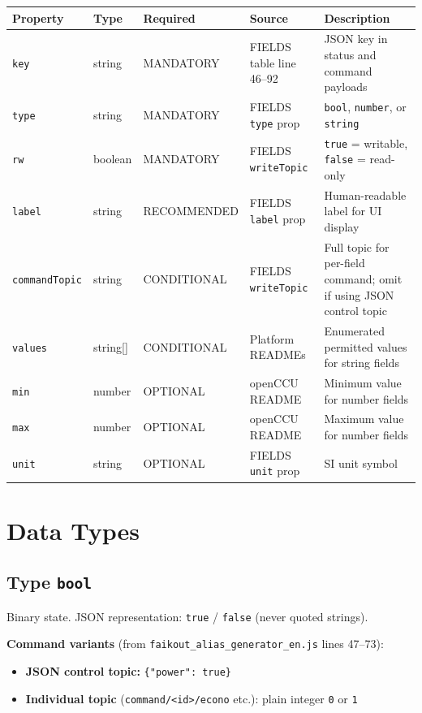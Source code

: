\documentclass[11pt,a4paper]{article}
\newcommand{\topic}[1]{\texttt{\color{accent}#1}}
\begin{document}
\begin{tabularx}{\textwidth}{@{}llllX@{}}
\toprule
\textbf{Property} & \textbf{Type} & \textbf{Required} & \textbf{Source} & \textbf{Description} \\
\midrule
\rowcolor{lightbg}
\texttt{key}          & string  & MANDATORY   & FIELDS table line 46–92 & JSON key in status and command payloads \\
\texttt{type}         & string  & MANDATORY   & FIELDS \texttt{type} prop & \texttt{bool}, \texttt{number}, or \texttt{string} \\
\rowcolor{lightbg}
\texttt{rw}           & boolean & MANDATORY   & FIELDS \texttt{writeTopic} & \texttt{true} = writable, \texttt{false} = read-only \\
\texttt{label}        & string  & RECOMMENDED & FIELDS \texttt{label} prop & Human-readable label for UI display \\
\rowcolor{lightbg}
\texttt{commandTopic} & string  & CONDITIONAL & FIELDS \texttt{writeTopic} & Full topic for per-field command; omit if using JSON control topic \\
\texttt{values}       & string[] & CONDITIONAL & Platform READMEs        & Enumerated permitted values for string fields \\
\rowcolor{lightbg}
\texttt{min}          & number  & OPTIONAL    & openCCU README          & Minimum value for number fields \\
\texttt{max}          & number  & OPTIONAL    & openCCU README          & Maximum value for number fields \\
\rowcolor{lightbg}
\texttt{unit}         & string  & OPTIONAL    & FIELDS \texttt{unit} prop & SI unit symbol \\
\bottomrule
\end{tabularx}

\section{Data Types}

\subsection{Type \texttt{bool}}

Binary state. JSON representation: \texttt{true} / \texttt{false} (never quoted strings).

\textbf{Command variants} (from \texttt{faikout\_alias\_generator\_en.js} lines 47–73):
\begin{itemize}[noitemsep]
  \item \textbf{JSON control topic:} \lstinline|{"power": true}|
  \item \textbf{Individual topic} (\topic{command/\textless id\textgreater/econo} etc.): plain integer \texttt{0} or \texttt{1}
\end{itemize}
\end{document}
